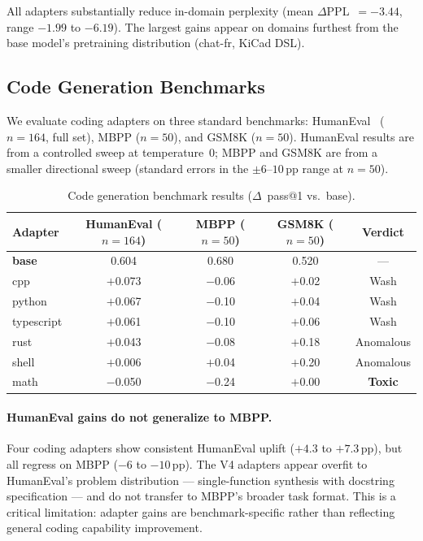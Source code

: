 \documentclass[11pt,a4paper]{article}
\begin{document}
All adapters substantially reduce in-domain perplexity (mean $\Delta$PPL~$= -3.44$, range $-1.99$ to $-6.19$). The largest gains appear on domains furthest from the base model's pretraining distribution (chat-fr, KiCad DSL).

\subsection{Code Generation Benchmarks}

We evaluate coding adapters on three standard benchmarks: HumanEval~\citep{chen2021evaluating} ($n{=}164$, full set), MBPP ($n{=}50$), and GSM8K ($n{=}50$). HumanEval results are from a controlled sweep at temperature~0; MBPP and GSM8K are from a smaller directional sweep (standard errors in the $\pm 6$--$10$\,pp range at $n{=}50$).

\begin{table}[h]
\centering
\caption{Code generation benchmark results ($\Delta$~pass@1 vs.\ base).}
\label{tab:benchmarks}
\begin{tabular}{lcccc}
\toprule
\textbf{Adapter} & \textbf{HumanEval} ($n{=}164$) & \textbf{MBPP} ($n{=}50$) & \textbf{GSM8K} ($n{=}50$) & \textbf{Verdict} \\
\midrule
\textbf{base} & 0.604 & 0.680 & 0.520 & --- \\
cpp & $+$0.073 & $-$0.06 & $+$0.02 & Wash \\
python & $+$0.067 & $-$0.10 & $+$0.04 & Wash \\
typescript & $+$0.061 & $-$0.10 & $+$0.06 & Wash \\
rust & $+$0.043 & $-$0.08 & $+$0.18 & Anomalous \\
shell & $+$0.006 & $+$0.04 & $+$0.20 & Anomalous \\
math & $-$0.050 & $-$0.24 & $+$0.00 & \textbf{Toxic} \\
\bottomrule
\end{tabular}
\end{table}

\paragraph{HumanEval gains do not generalize to MBPP.}
Four coding adapters show consistent HumanEval uplift ($+4.3$ to $+7.3$\,pp), but all regress on MBPP ($-6$ to $-10$\,pp). The V4 adapters appear overfit to HumanEval's problem distribution --- single-function synthesis with docstring specification --- and do not transfer to MBPP's broader task format. This is a critical limitation: adapter gains are benchmark-specific rather than reflecting general coding capability improvement.
\end{document}
